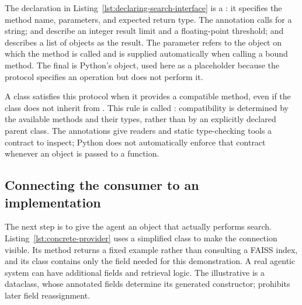 The declaration in Listing~\ref{lst:declaring-search-interface} is a : it specifies the method name, parameters, and expected return type. The annotation  calls for a string;  and  describe an integer result limit and a floating-point threshold; and  describes a list of  objects as the result. The  parameter refers to the object on which the method is called and is supplied automatically when calling a bound method. The final  is Python's  object, used here as a placeholder because the protocol specifies an operation but does not perform it.

A class satisfies this protocol when it provides a compatible  method, even if the class does not inherit from . This rule is called : compatibility is determined by the available methods and their types, rather than by an explicitly declared parent class. The annotations give readers and static type-checking tools a contract to inspect; Python does not automatically enforce that contract whenever an object is passed to a function.

\subsection{Connecting the consumer to an implementation}
The next step is to give the agent an object that actually performs search. Listing~\ref{lst:concrete-provider} uses a simplified  class to make the connection visible. Its  method returns a fixed example rather than consulting a FAISS index, and its  class contains only the field needed for this demonstration. A real agentic system can have additional fields and retrieval logic. The illustrative  is a dataclass, whose annotated fields determine its generated constructor;  prohibits later field reassignment.

